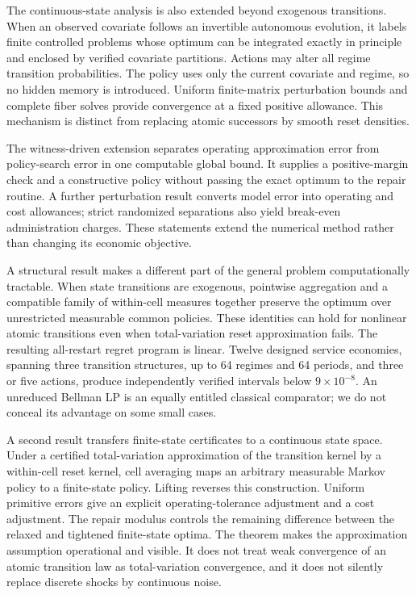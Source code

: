 The continuous-state analysis is also extended beyond exogenous transitions. When an observed covariate follows an invertible autonomous evolution, it labels finite controlled problems whose optimum can be integrated exactly in principle and enclosed by verified covariate partitions. Actions may alter all regime transition probabilities. The policy uses only the current covariate and regime, so no hidden memory is introduced. Uniform finite-matrix perturbation bounds and complete fiber solves provide convergence at a fixed positive allowance. This mechanism is distinct from replacing atomic successors by smooth reset densities.

The witness-driven extension separates operating approximation error from policy-search error in one computable global bound. It supplies a positive-margin check and a constructive policy without passing the exact optimum to the repair routine. A further perturbation result converts model error into operating and cost allowances; strict randomized separations also yield break-even administration charges. These statements extend the numerical method rather than changing its economic objective.

A structural result makes a different part of the general problem computationally tractable. When state transitions are exogenous, pointwise aggregation and a compatible family of within-cell measures together preserve the optimum over unrestricted measurable common policies. These identities can hold for nonlinear atomic transitions even when total-variation reset approximation fails. The resulting all-restart regret program is linear. Twelve designed service economies, spanning three transition structures, up to 64 regimes and 64 periods, and three or five actions, produce independently verified intervals below $9\times10^{-8}$. An unreduced Bellman LP is an equally entitled classical comparator; we do not conceal its advantage on some small cases.

A second result transfers finite-state certificates to a continuous state space. Under a certified total-variation approximation of the transition kernel by a within-cell reset kernel, cell averaging maps an arbitrary measurable Markov policy to a finite-state policy. Lifting reverses this construction. Uniform primitive errors give an explicit operating-tolerance adjustment and a cost adjustment. The repair modulus controls the remaining difference between the relaxed and tightened finite-state optima. The theorem makes the approximation assumption operational and visible. It does not treat weak convergence of an atomic transition law as total-variation convergence, and it does not silently replace discrete shocks by continuous noise.

